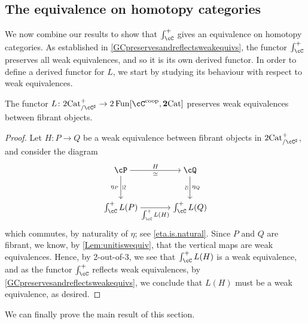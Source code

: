 \documentclass[11pt, dvipsnames]{amsart}
\begin{document}
\subsection{The equivalence on homotopy categories}

We now  combine our results to show that $\int_\cC^+$ gives an equivalence on homotopy categories. As established in \cref{GCpreservesandreflectsweakequivs}, the functor $\int_\cC^+$ preserves all weak equivalences, and so it is its own derived functor. In order to define a derived functor for $L$, we start by studying its behaviour with respect to weak equivalences.

\begin{prop}\label{L.pres.weak.equiv}
    The functor $L\colon \mslicetwocat\to 2\Fun[\cC^\coop,\ttwocat]$ preserves weak equivalences between fibrant objects.
\end{prop}
\begin{proof}
    Let $H\colon P\to Q$ be a weak equivalence between fibrant objects in $\mslicetwocat$, and consider the diagram
    \[\begin{tikzcd}[cramped,sep=scriptsize]
    	\cP && \cQ \\
    	\\
    	{\int_{\cC}^{+}L(P)} && {\int_{\cC}^{+}L(Q)}
    	\arrow["H","\simeq"', from=1-1, to=1-3]
    	\arrow["{\eta_P}"',"\mathrel{\rotatebox[origin=c]{-90}{$\simeq$}}", from=1-1, to=3-1]
    	\arrow["{\eta_Q}","\mathrel{\rotatebox[origin=c]{90}{$\simeq$}}"', from=1-3, to=3-3]
    	\arrow["{\int_{\cC}^{+}L(H)}"', from=3-1, to=3-3]
    \end{tikzcd}\]
     which commutes, by naturality of $\eta$; see \cref{eta.is.natural}. Since $P$ and $Q$ are fibrant, we know, by \cref{Lem:unitiswequiv}, that the vertical maps are weak equivalences. Hence, by 2-out-of-3, we see that $\int_\cC^+ L(H)$ is a weak equivalence, and as the functor $\int_\cC^+$ reflects weak equivalences, by \cref{GCpreservesandreflectsweakequivs}, we conclude that $L(H)$ must be a weak equivalence, as desired.
\end{proof}

    We can finally prove the main result of this section.
\end{document}
